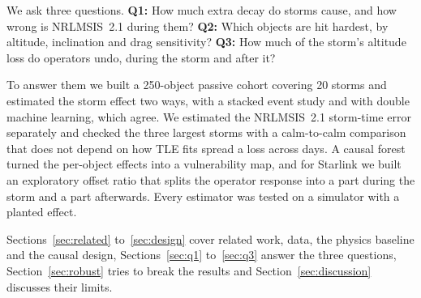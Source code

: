 We ask three questions.
\textbf{Q1:} How much extra decay do storms cause, and how wrong is NRLMSIS~2.1 during them?
\textbf{Q2:} Which objects are hit hardest, by altitude, inclination and drag sensitivity?
\textbf{Q3:} How much of the storm's altitude loss do operators undo, during the storm and
after it?

To answer them we built a 250-object passive cohort covering 20 storms and estimated the storm
effect two ways, with a stacked event study and with double machine learning, which agree. We
estimated the NRLMSIS~2.1 storm-time error separately and checked the three largest storms
with a calm-to-calm comparison that does not depend on how TLE fits spread a loss across days.
A causal forest turned the per-object effects into a vulnerability map, and for Starlink we
built an exploratory offset ratio that splits the operator response into a part during the
storm and a part afterwards. Every estimator was tested on a simulator with a planted effect.

Sections~\ref{sec:related} to~\ref{sec:design} cover related work, data, the physics baseline
and the causal design, Sections~\ref{sec:q1} to~\ref{sec:q3} answer the three questions,
Section~\ref{sec:robust} tries to break the results and Section~\ref{sec:discussion} discusses
their limits.
